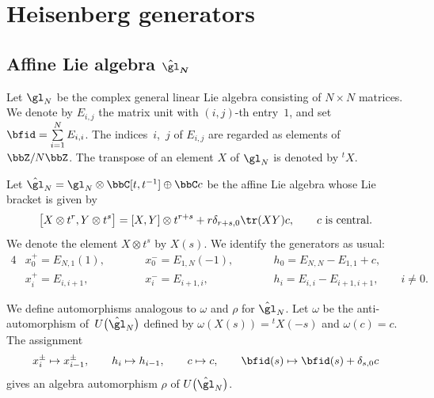 \section{Heisenberg generators}\label{section4}

\subsection[Affine Lie algebra $\hat{\gl}_N$]{Affine Lie algebra $\boldsymbol{\hat{\gl}_N}$}
Let $\gl_N$ be the complex general linear Lie algebra consisting of $N \times N$ matrices. We denote by $E_{i,j}$ the matrix unit with $(i,j)$-th entry~$1$, and set $\bfid = \sum\limits_{i=1}^N E_{i,i}$. The indices~$i$,~$j$ of $E_{i,j}$ are regarded as elements of $\bbZ/N\bbZ$. The transpose of an element $X$ of $\gl_N$ is denoted by ${}^t X$.

Let $\hat{\gl}_N = \gl_N \otimes \bbC[t,t^{-1}] \oplus \bbC c$ be the affine Lie algebra whose Lie bracket is given by
\begin{gather*}
\big[X \otimes t^{r}, Y \otimes t^{s}\big] = [X,Y] \otimes t^{r+s} + r \delta_{r+s,0} \tr(XY) c, \qquad \text{$c$ is central}.
\end{gather*}
We denote the element $X \otimes t^s$ by $X(s)$. We identify the generators as usual:
\begin{alignat*}{4}
& x_0^+= E_{N,1}(1), \qquad && x_0^{-} = E_{1,N}(-1), \qquad && h_0= E_{N,N} - E_{1,1} + c,&\\
& x_{i}^{+}= E_{i,i+1}, \qquad && x_i^{-}= E_{i+1,i}, \qquad &&h_i= E_{i,i}-E_{i+1,i+1}, \qquad i \neq 0.&
\end{alignat*}

We define automorphisms analogous to $\omega$ and $\rho$ for $\hat{\gl}_N$. Let $\omega$ be the anti-automorphism of~${U}\big(\hat{\gl}_N\big)$ defined by $\omega(X(s))= {}^{t}X(-s)$ and $\omega(c)=c$.
The assignment
\begin{gather*}
x_i^{\pm} \mapsto x_{i-1}^{\pm}, \qquad h_i \mapsto h_{i-1}, \qquad c \mapsto c, \qquad \bfid(s) \mapsto \bfid(s) + \delta_{s,0}c
\end{gather*}
gives an algebra automorphism $\rho$ of $U\big(\hat{\gl}_N\big)$.

